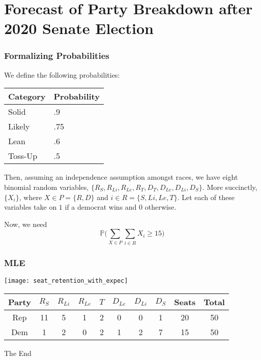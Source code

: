 \documentclass{beamer}
\begin{document}
\section{Forecast of Party Breakdown after 2020 Senate Election}


\begin{frame}
\frametitle{Formalizing Probabilities}

We define the following probabilities:

\begin{table}
\begin{tabular}{l l}
\toprule
\textbf{Category} & \textbf{Probability}\\
\midrule
Solid & .9 \\
Likely & .75 \\
Lean & .6 \\
Toss-Up & .5 \\
\bottomrule
\end{tabular}
\end{table}

Then, assuming an independence assumption amongst races, we have eight binomial random variables, $\{R_S, R_{Li}, R_{Le}, R_T, D_T, D_{Le}, D_{Li}, D_S\}$.  More succinctly, $\{X_i\}$, where $X \in P = \{R, D\}$ and $i \in R = \{S, Li, Le, T\}$.  Let each of these variables take on $1$ if a democrat wins and $0$ otherwise.

Now, we need $$\boxed{\mathbb{P}\bigg(\sum_{X \in P} \sum_{i \in R} X_i \geq 15\bigg)}$$

\end{frame}


\begin{frame}
\frametitle{MLE}

\texttt{[image: seat\_retention\_with\_expec]}

\begin{table}
\begin{tabular}{c | c c c c c c c | c | c}
\toprule
\textbf{Party} & \textbf{$R_S$} & \textbf{$R_{Li}$} & \textbf{$R_{Le}$} & \textbf{$T$} & \textbf{$D_{Le}$} & \textbf{$D_{Li}$} & \textbf{$D_S$} & \textbf{Seats} & \textbf{Total}\\
\midrule
Rep & 11 & 5 & 1 & 2 & 0 & 0 & 1 & 20 & 50\\
Dem & 1 & 2 & 0 & 2 & 1 & 2 & 7 & 15 & 50\\
\bottomrule
\end{tabular}
\end{table}

\end{frame}


\begin{frame}
\Huge{\centerline{The End}}
\end{frame}

\end{document}
